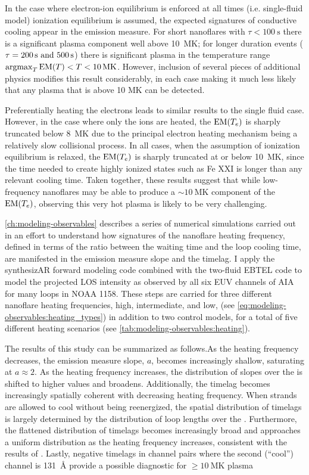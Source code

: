 In the case where electron-ion equilibrium is enforced at all times (i.e. single-fluid model) ionization equilibrium is assumed, the expected signatures of conductive cooling appear in the emission measure. For short nanoflares with $\tau<\SI{100}{\second}$ there is a significant plasma component well above \SI{10}{\mega\kelvin}; for longer duration events ($\tau=\SIlist{200;500}{\second}$) there is significant plasma in the temperature range $\argmax_T{\emd[T]} < T < \SI{10}{\mega\kelvin}$. However, inclusion of several pieces of additional physics modifies this result considerably, in each case making it much less likely that any plasma that is above 10 MK can be detected.

Preferentially heating the electrons leads to similar results to the single fluid case. However, in the case where only the ions are heated, the $\emd$ is sharply truncated below \SI{8}{\mega\kelvin} due to the principal electron heating mechanism being a relatively slow collisional process. In all cases, when the assumption of ionization equilibrium is relaxed, the $\emd$ is sharply truncated at or below \SI{10}{\mega\kelvin}, since the time needed to create highly ionized states such as Fe XXI is longer than any relevant cooling time. Taken together, these results suggest that while low-frequency nanoflares may be able to produce a $\sim\SI{10}{\mega\kelvin}$ component of the $\emd$, observing this very hot plasma is likely to be very challenging. 

\autoref{ch:modeling-observables} describes a series of numerical simulations carried out in an effort to understand how signatures of the nanoflare heating frequency, defined in terms of the ratio between the waiting time and the loop cooling time, are manifested in the emission measure slope and the timelag. I apply the synthesizAR forward modeling code combined with the two-fluid EBTEL code to model the projected LOS intensity as observed by all six EUV channels of AIA for many loops in \AR{} NOAA 1158. These steps are carried for three different nanoflare heating frequencies, high, intermediate, and low, (see \autoref{eq:modeling-observables:heating_types}) in addition to two control models, for a total of five different heating scenarios (see \autoref{tab:modeling-observables:heating}).

The results of this study can be summarized as follows.As the heating frequency decreases, the emission measure slope, $a$, becomes increasingly shallow, saturating at $a\approx2$. As the heating frequency increases, the distribution of slopes over the \AR{} is shifted to higher values and broadens. Additionally, the timelag becomes increasingly spatially coherent with decreasing heating frequency. When strands are allowed to cool without being reenergized, the spatial distribution of timelags is largely determined by the distribution of loop lengths over the \AR{}. Furthermore, the flattened distribution of timelags becomes increasingly broad and approaches a uniform distribution as the heating frequency increases, consistent with the results of \citet{viall_signatures_2016}. Lastly, negative timelags in channel pairs where the second (``cool'') channel is \SI{131}{\angstrom} provide a possible diagnostic for $\ge\SI{10}{\mega\kelvin}$ plasma

